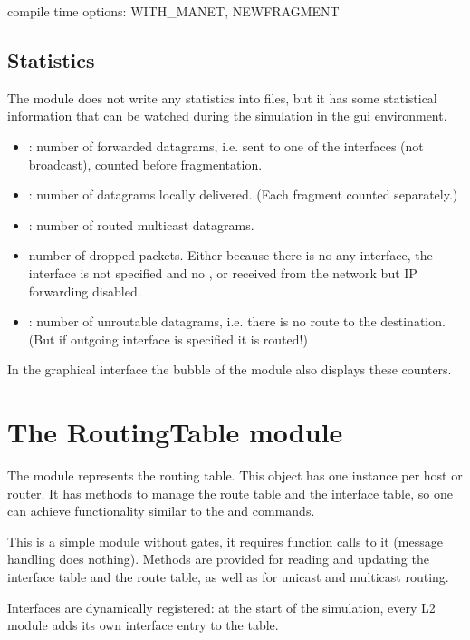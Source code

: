 compile time options: WITH\_MANET, NEWFRAGMENT

\subsection{Statistics}

The  module does not write any statistics into files,
but it has some statistical information that can be watched during
the simulation in the gui environment.
\begin{itemize}
  \item {}: number of forwarded datagrams, i.e. sent to one of the
        interfaces (not broadcast), counted before fragmentation.
  \item {}: number of datagrams locally delivered.
        (Each fragment counted separately.)
  \item {}: number of routed multicast datagrams.
  \item {} number of dropped packets.
        Either because there is no any interface, the interface is not specified and
        no , or received from the network but IP forwarding disabled.
  \item {}: number of unroutable datagrams, i.e. there is no
        route to the destination. (But if outgoing interface is specified it is routed!)
\end{itemize}

In the graphical interface the bubble of the  module
also displays these counters.


\section{The RoutingTable module}

The  module represents the routing table.
This object has one instance per host or router. It has methods to manage
the route table and the interface table,
so one can achieve functionality similar to the  and
 commands.

This is a simple module without gates, it requires function calls to it
(message handling does nothing). Methods are provided for reading and
updating the interface table and the route table, as well as for unicast
and multicast routing.

Interfaces are dynamically registered: at the start of the simulation,
every L2 module adds its own interface entry to the table.

